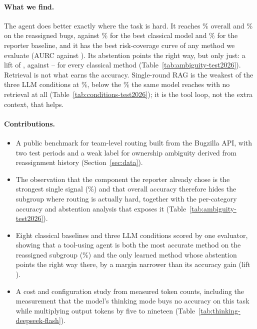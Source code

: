 \documentclass[sigconf,anonymous]{acmart}
\begin{document}
\paragraph{What we find.}
The agent does better exactly where the task is hard. It reaches \nAgentAcc\% overall and
\nAgentSpecAcc\% on the reassigned bugs, against \nLrSpecAcc\% for the best classical model and
\nRepSpecAcc\% for the reporter baseline, and it has the best risk-coverage curve of any method we
evaluate (AURC \nAgentAurc{} against \nLrAurc). Its abstention points the right way, but only just: a
lift of \nAgentLift, against \nClassicalLiftMin--\nClassicalLiftMax{} for every classical method
(Table~\ref{tab:ambiguity-test2026}). Retrieval is not what earns the accuracy. Single-round RAG is
the weakest of the three LLM conditions at \nRagAcc\%, below the \nZSAcc\% the same model reaches
with no retrieval at all (Table~\ref{tab:conditions-test2026}); it is the tool loop, not the extra
context, that helps.

\paragraph{Contributions.}
\begin{itemize}
\item A public benchmark for team-level routing built from the Bugzilla API, with two test periods
and a weak label for ownership ambiguity derived from reassignment history
(Section~\ref{sec:data}).
\item The observation that the component the reporter already chose is the strongest single signal
(\nRepAcc\%) and that overall accuracy therefore hides the subgroup where routing is actually hard,
together with the per-category accuracy and abstention analysis that exposes it
(Table~\ref{tab:ambiguity-test2026}).
\item Eight classical baselines and three LLM conditions scored by one evaluator, showing that a
tool-using agent is both the most accurate method on the reassigned subgroup (\nAgentSpecAcc\%) and
the only learned method whose abstention points the right way there, by a margin narrower than its
accuracy gain (lift \nAgentLift).
\item A cost and configuration study from measured token counts, including the measurement that
the model's thinking mode buys no accuracy on this task while multiplying output tokens by five to
nineteen (Table~\ref{tab:thinking-deepseek-flash}).
\end{itemize}
\end{document}

